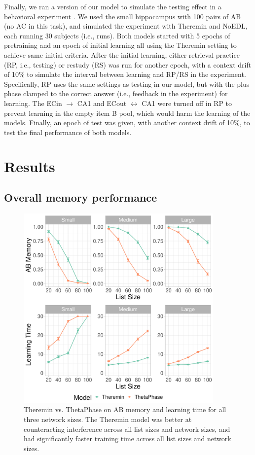 \documentclass[11pt,twoside]{article}
\newif\myifpdf
\begin{document}
Finally, we ran a version of our model to simulate the testing effect in a behavioral experiment \citep{CarrierPashler92}.  We used the small hippocampus with 100 pairs of AB (no AC in this task), and simulated the experiment with Theremin and NoEDL, each running 30 subjects (i.e., runs).  Both models started with 5 epochs of pretraining and an epoch of initial learning all using the Theremin setting to achieve same initial criteria.  After the initial learning, either retrieval practice (RP, i.e., testing) or restudy (RS) was run for another epoch, with a context drift of 10\% to simulate the interval between learning and RP/RS in the experiment. Specifically, RP uses the same settings as testing in our model, but with the plus phase clamped to the correct answer (i.e., feedback in the experiment) for learning.  The ECin $\rightarrow$ CA1 and ECout $\leftrightarrow$ CA1 were turned off in RP to prevent learning in the empty item B pool, which would harm the learning of the models.  Finally, an epoch of test was given, with another context drift of 10\%, to test the final performance of both models. 

\section{Results}

\subsection{Overall memory performance}

\begin{figure}
  \centering\includegraphics[width=4in]{fig_hip_edl_thetaphase}
  \caption{\footnotesize Theremin vs. ThetaPhase on AB memory and learning time for all three network sizes.  The Theremin model was better at counteracting interference across all list sizes and network sizes, and had significantly faster training time across all list sizes and network sizes.}
\label{fig.thetaphase}
\end{figure}
\end{document}
